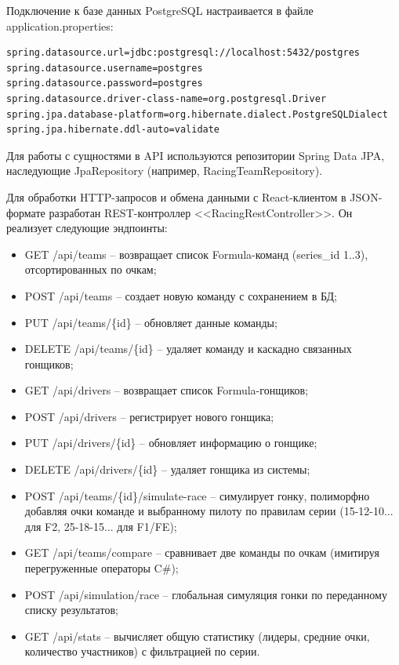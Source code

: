 \documentclass[oneside,a4paper,14pt]{extarticle}
\begin{document}
Подключение к базе данных PostgreSQL настраивается в файле application.properties:

\begin{verbatim}
spring.datasource.url=jdbc:postgresql://localhost:5432/postgres
spring.datasource.username=postgres
spring.datasource.password=postgres
spring.datasource.driver-class-name=org.postgresql.Driver
spring.jpa.database-platform=org.hibernate.dialect.PostgreSQLDialect
spring.jpa.hibernate.ddl-auto=validate
\end{verbatim}

Для работы с сущностями в API используются репозитории Spring Data JPA, наследующие JpaRepository (например, RacingTeamRepository).

Для обработки HTTP-запросов и обмена данными с React-клиентом в JSON-формате разработан REST-контроллер <<RacingRestController>>. Он реализует следующие эндпоинты:
\begin{itemize}
  \item[--] GET /api/teams -- возвращает список Formula-команд (series\_id 1..3), отсортированных по очкам;
  \item[--] POST /api/teams -- создает новую команду с сохранением в БД;
  \item[--] PUT /api/teams/\{id\} -- обновляет данные команды;
  \item[--] DELETE /api/teams/\{id\} -- удаляет команду и каскадно связанных гонщиков;
  \item[--] GET /api/drivers -- возвращает список Formula-гонщиков;
  \item[--] POST /api/drivers -- регистрирует нового гонщика;
  \item[--] PUT /api/drivers/\{id\} -- обновляет информацию о гонщике;
  \item[--] DELETE /api/drivers/\{id\} -- удаляет гонщика из системы;
  \item[--] POST /api/teams/\{id\}/simulate-race -- симулирует гонку, полиморфно добавляя очки команде и выбранному пилоту по правилам серии (15-12-10... для F2, 25-18-15... для F1/FE);
  \item[--] GET /api/teams/compare -- сравнивает две команды по очкам (имитируя перегруженные операторы C\#);
  \item[--] POST /api/simulation/race -- глобальная симуляция гонки по переданному списку результатов;
  \item[--] GET /api/stats -- вычисляет общую статистику (лидеры, средние очки, количество участников) с фильтрацией по серии.
\end{itemize}
\end{document}
